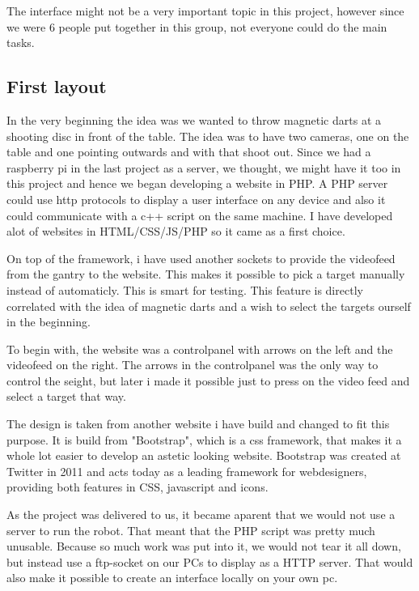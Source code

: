\label{sec:gui}

The interface might not be a very important topic in this project, however since we were 6 people put together in this group, not everyone could do the main tasks.

\subsection{First layout}

In the very beginning the idea was we wanted to throw magnetic darts at a shooting disc in front of the table. 
The idea was to have two cameras, one on the table and one pointing outwards and with that shoot out. 
Since we had a raspberry pi in the last project as a server, we thought, we might have it too in this project and hence we began developing a website in PHP.
A PHP server could use http protocols to display a user interface on any device and also it could communicate with a c++ script on the same machine. I have developed alot of websites in HTML/CSS/JS/PHP so it came as a first choice.

On top of the framework, i have used another sockets to provide the videofeed from the gantry to the website. This makes it possible to pick a target manually instead of automaticly. This is smart for testing.
This feature is directly correlated with the idea of magnetic darts and a wish to select the targets ourself in the beginning. 

To begin with, the website was a controlpanel with arrows on the left and the videofeed on the right. The arrows in the controlpanel was the only way to control the seight, but later i made it possible just to press on the video feed and select a target that way.

The design is taken from another website i have build and changed to fit this purpose. 
It is build from "Bootstrap", which is a css framework, that makes it a whole lot easier to develop an astetic looking website. 
Bootstrap was created at Twitter in 2011 and acts today as a leading framework for webdesigners, providing both features in CSS, javascript and icons.

As the project was delivered to us, it became aparent that we would not use a server to run the robot. That meant that the PHP script was pretty much unusable. 
Because so much work was put into it, we would not tear it all down, but instead use a ftp-socket on our PCs to display as a HTTP server. 
That would also make it possible to create an interface locally on your own pc. 

